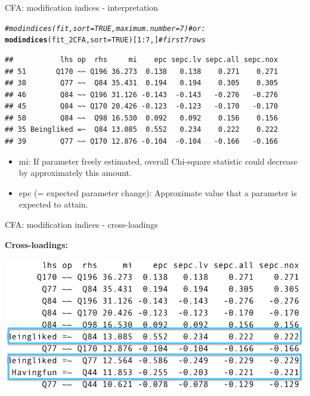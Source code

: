 \documentclass[10pt]{beamer}\usepackage[]{graphicx}\usepackage[]{xcolor}
\makeatletter
\newcommand{\hlnum}[1]{\textcolor[rgb]{0.686,0.059,0.569}{#1}}%
\newcommand{\hlcom}[1]{\textcolor[rgb]{0.678,0.584,0.686}{\textit{#1}}}%
\newcommand{\hlopt}[1]{\textcolor[rgb]{0,0,0}{#1}}%
\newcommand{\hlstd}[1]{\textcolor[rgb]{0.345,0.345,0.345}{#1}}%
\newcommand{\hlkwc}[1]{\textcolor[rgb]{0.333,0.667,0.333}{#1}}%
\newcommand{\hlkwd}[1]{\textcolor[rgb]{0.737,0.353,0.396}{\textbf{#1}}}%
\newenvironment{kframe}{%
 \def\at@end@of@kframe{}%
 \ifinner\ifhmode%
  \def\at@end@of@kframe{\end{minipage}}%
  \begin{minipage}{\columnwidth}%
 \fi\fi%
 \def\FrameCommand##1{\hskip\@totalleftmargin \hskip-\fboxsep
 \colorbox{shadecolor}{##1}\hskip-\fboxsep
     \hskip-\linewidth \hskip-\@totalleftmargin \hskip\columnwidth}%
 \MakeFramed {\advance\hsize-\width
   \@totalleftmargin\z@ \linewidth\hsize
   \@setminipage}}%
 {\par\unskip\endMakeFramed%
 \at@end@of@kframe}
\newenvironment{knitrout}{}{} %
\makeatother
\begin{document}
%
\begin{frame}[fragile]{CFA: modification indices - interpretation}


\begin{knitrout}
\color{fgcolor}\begin{kframe}
\begin{alltt}
\hlcom{#modindices(fit, sort = TRUE, maximum.number = 7) # or:}
\hlkwd{modindices}\hlstd{(fit_2CFA,} \hlkwc{sort} \hlstd{=} \hlnum{TRUE}\hlstd{)[}\hlnum{1}\hlopt{:}\hlnum{7}\hlstd{,]} \hlcom{# first 7 rows}
\end{alltt}
\begin{verbatim}
##           lhs op  rhs     mi    epc sepc.lv sepc.all sepc.nox
## 51       Q170 ~~ Q196 36.273  0.138   0.138    0.271    0.271
## 38        Q77 ~~  Q84 35.431  0.194   0.194    0.305    0.305
## 46        Q84 ~~ Q196 31.126 -0.143  -0.143   -0.276   -0.276
## 45        Q84 ~~ Q170 20.426 -0.123  -0.123   -0.170   -0.170
## 50        Q84 ~~  Q98 16.530  0.092   0.092    0.156    0.156
## 35 Beingliked =~  Q84 13.085  0.552   0.234    0.222    0.222
## 39        Q77 ~~ Q170 12.876 -0.104  -0.104   -0.166   -0.166
\end{verbatim}
\end{kframe}
\end{knitrout}

\begin{itemize}
  \item mi: If parameter freely estimated, overall Chi-square statistic could decrease by approximately this amount.
  \item epc (= expected parameter change): Approximate value that a parameter is expected to attain.
\end{itemize}

\end{frame}
%
\begin{frame}{CFA: modification indices - cross-loadings}

\textbf{Cross-loadings:} \vspace{5mm}

\includegraphics[width=\linewidth,height=0.5\textwidth,keepaspectratio]{images/slide49.png} 

\end{frame}
\end{document}

